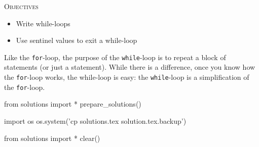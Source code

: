 
\textsc{Objectives}

\begin{itemize}
\item
  Write while-loops
\item
  Use sentinel values to exit a while-loop
\end{itemize}

Like the \texttt{for}-loop, the purpose of the \texttt{while}-loop is to
repeat a block of statements (or just a statement). While there is a
difference, once you know how the \texttt{for}-loop works, the while-loop
is easy: the \texttt{while}-loop is a simplification of the
\texttt{for}-loop.








\begin{python0}
from solutions import *
prepare_solutions()
\end{python0}
\begin{python}
import os
os.system('cp solutions.tex solution.tex.backup')  
\end{python}

\begin{python0}
from solutions import *
clear()
\end{python0}
